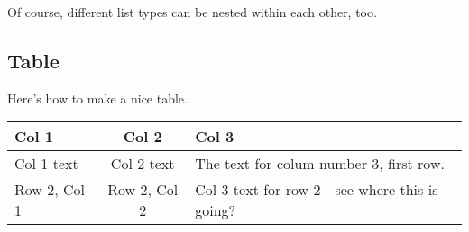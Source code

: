 \documentclass[11pt]{article} %
\providecommand{\tabularnewline}{\\}
\begin{document}
Of course, different list types can be nested within each other, too.

\subsection{Table}

Here's how to make a nice table.\\
\bigskip
\begin{tabular}{|l|c|p{11cm}|}
\hline
\rowcolor{Gray} Col 1 & Col 2 & Col 3\tabularnewline
\hline
Col 1 text & Col 2 text & The text for colum number 3, first row.\tabularnewline
\hline
Row 2, Col 1 & Row 2, Col 2 & Col 3 text for row 2 - see where this is going?
\tabularnewline
\hline
\end{tabular}
\end{document}
